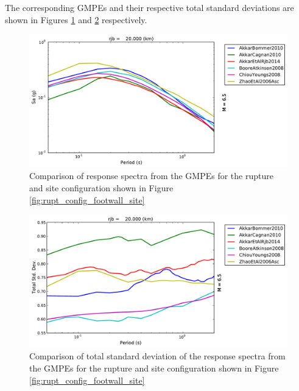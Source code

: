 The corresponding GMPEs and their respective total standard deviations are shown in Figures \ref{fig:spectra_trellis_rupt_footwall} and \ref{fig:spectra_sigma_trellis_rupt_footwall} respectively.

\begin{figure}[htb]
	\centering
		\includegraphics[width=\textwidth]{./figures/trellis/spectra_trellis_rupt_footwall.pdf}
	\caption{Comparison of response spectra from the GMPEs for the rupture and site configuration shown in Figure \ref{fig:rupt_config_footwall_site}}
	\label{fig:spectra_trellis_rupt_footwall}
\end{figure}

\begin{figure}[htb]
	\centering
		\includegraphics[width=\textwidth]{./figures/trellis/spectra_sigma_trellis_rupt_footwall.pdf}
	\caption{Comparison of total standard deviation of the response spectra from the GMPEs for the rupture and site configuration shown in Figure \ref{fig:rupt_config_footwall_site}}
	\label{fig:spectra_sigma_trellis_rupt_footwall}
\end{figure}